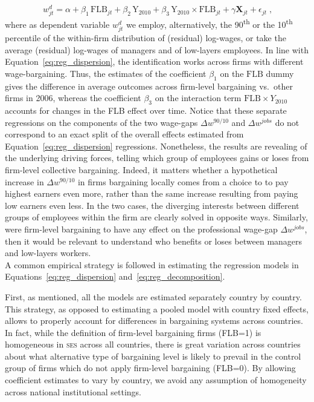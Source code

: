 \documentclass[12pt]{article}
\begin{document}
\begin{equation}
\label{eq:reg_decomposition}
\ w^d_{jt} = \alpha + \beta_1\, \mathrm{FLB}_{jt} + \beta_2\, \mathrm{Y}_{2010} + \beta_3\, \mathrm{Y}_{2010} \times \mathrm{FLB}_{jt} + \gamma\bm{X}_{jt} + \epsilon_{jt} \;,
\end{equation}
where as dependent variable $w^d_{jt}$ we employ, alternatively, the
90\textsuperscript{th} or the 10\textsuperscript{th} percentile of the
within-firm distribution of (residual) log-wages, or take the average
(residual) log-wages of managers and of low-layers employees. In line
with Equation~\eqref{eq:reg_dispersion}, the identification works
across firms with different wage-bargaining. Thus, the estimates of
the coefficient $\beta_1$ on the $\mathrm{FLB}$ dummy gives the
difference in average outcomes across firm-level bargaining vs.~other
firms in 2006, whereas the coefficient $\beta_3$ on the interaction
term $\mathrm{FLB} \times Y_{2010}$ accounts for changes in the FLB
effect over time. Notice that these separate regressions on the
components of the two wage-gaps $\Delta w^{90/10}$ and $\Delta
w^{jobs}$ do not correspond to an exact split of the overall effects
estimated from Equation~\eqref{eq:reg_dispersion} regressions.
Nonetheless, the results are revealing of the underlying driving
forces, telling which group of employees gains or loses from
firm-level collective bargaining. Indeed, it matters whether a
hypothetical increase in $\Delta w^{90/10}$ in firms bargaining
locally comes from a choice to to pay highest earners even more,
rather than the same increase resulting from paying low earners even
less. In the two cases, the diverging interests between different
groups of employees within the firm are clearly solved in opposite
ways.  Similarly, were firm-level bargaining to have any effect on the
professional wage-gap $\Delta w^{jobs}$, then it would be relevant to
understand who benefits or
loses between managers and low-layers workers.\\

A common empirical strategy is followed in estimating the regression
models in Equations~\ref{eq:reg_dispersion}
and~\ref{eq:reg_decomposition}.

First, as mentioned, all the models are estimated separately country
by country. This strategy, as opposed to estimating a pooled model
with country fixed effects, allows to properly account for differences
in bargaining systems across countries. In fact, while the definition
of firm-level bargaining firms (FLB=1) is homogeneous in \textsc{ses}
across all countries, there is great variation across countries about
what alternative type of bargaining level is likely to prevail in
the control group of firms which do not apply firm-level bargaining
(FLB=0). By allowing coefficient estimates to vary by country, we
avoid any assumption of homogeneity across national institutional
settings.
\end{document}
